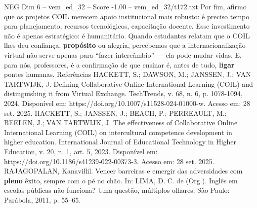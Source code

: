 \begin{textsample}{NEG Dim 6 – vem\_ed\_32 – Score -1.00 – vem\_ed\_32/t172.txt}
Por fim, afirmo que os projetos COIL merecem apoio institucional mais robusto: é preciso tempo para planejamento, recursos tecnológicos, capacitação docente.
Esse investimento não é apenas estratégico: é humanitário.
Quando estudantes relatam que o COIL lhes deu confiança, \textbf{propósito} ou alegria, percebemos que a internacionalização virtual não serve apenas para “fazer intercâmbio” — ela pode mudar vidas.
E, para nós, professores, é a confirmação de que ensinar é, antes de tudo, \textbf{ligar} pontes humanas.
Referências HACKETT, S.; DAWSON, M.; JANSSEN, J.; VAN TARTWIJK, J.
Defining Collaborative Online International Learning (COIL) and distinguishing it from Virtual Exchange.
TechTrends, v. 68, n. 6, p. 1078-1094, 2024.
Disponível em: https://doi.org/10.1007/s11528-024-01000-w.
Acesso em: 28 set. 2025.
HACKETT, S.; JANSSEN, J.; BEACH, P.; PERREAULT, M.; BEELEN, J.; VAN TARTWIJK, J.
The effectiveness of Collaborative Online International Learning (COIL) on intercultural competence development in higher education.
International Journal of Educational Technology in Higher Education, v. 20, n. 1, art. 5, 2023.
Disponível em: https://doi.org/10.1186/s41239-022-00373-3.
Acesso em: 28 set. 2025.
RAJAGOPALAN, Kanavillil.
Vencer barreiras e emergir das adversidades com \textbf{pleno} êxito, sempre com o pé no chão.
In: LIMA, D.
C. de (Org.).
Inglês em escolas públicas não funciona?
Uma questão, múltiplos olhares.
São Paulo: Parábola, 2011, p. 55–65.

\end{textsample}
